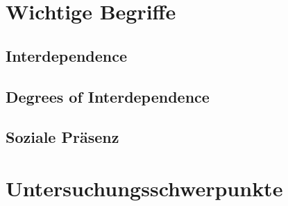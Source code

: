 

\section{Wichtige Begriffe}

\subsection{Interdependence}

\subsection{Degrees of Interdependence}

\subsection{Soziale Präsenz}



\section{Untersuchungsschwerpunkte}

